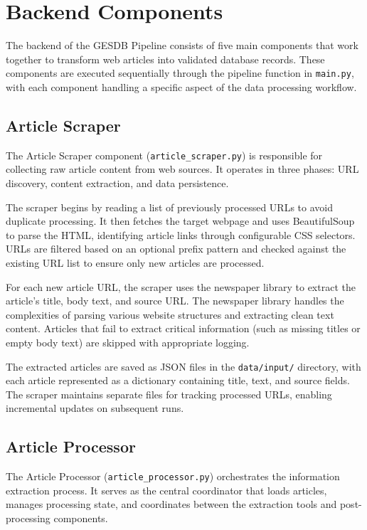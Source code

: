 \documentclass[11pt]{article}
\begin{document}
\section{Backend Components}
\label{sec:backend}

The backend of the GESDB Pipeline consists of five main components that work together to transform web articles into validated database records. These components are executed sequentially through the pipeline function in \texttt{main.py}, with each component handling a specific aspect of the data processing workflow.

\subsection{Article Scraper}

The Article Scraper component (\texttt{article\_scraper.py}) is responsible for collecting raw article content from web sources. It operates in three phases: URL discovery, content extraction, and data persistence.

The scraper begins by reading a list of previously processed URLs to avoid duplicate processing. It then fetches the target webpage and uses BeautifulSoup to parse the HTML, identifying article links through configurable CSS selectors. URLs are filtered based on an optional prefix pattern and checked against the existing URL list to ensure only new articles are processed.

For each new article URL, the scraper uses the newspaper library to extract the article's title, body text, and source URL. The newspaper library handles the complexities of parsing various website structures and extracting clean text content. Articles that fail to extract critical information (such as missing titles or empty body text) are skipped with appropriate logging.

The extracted articles are saved as JSON files in the \texttt{data/input/} directory, with each article represented as a dictionary containing title, text, and source fields. The scraper maintains separate files for tracking processed URLs, enabling incremental updates on subsequent runs.

\subsection{Article Processor}

The Article Processor (\texttt{article\_processor.py}) orchestrates the information extraction process. It serves as the central coordinator that loads articles, manages processing state, and coordinates between the extraction tools and post-processing components.
\end{document}
